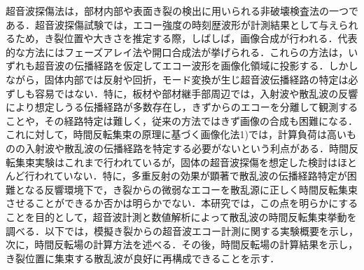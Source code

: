 超音波探傷法は，部材内部や表面き裂の検出に用いられる非破壊検査法の一つである．超音波探傷試験では，エコー強度の時刻歴波形が計測結果として与えられるため，き裂位置や大きさを推定する際，しばしば，画像合成が行われる．代表的な方法にはフェーズアレイ法や開口合成法が挙げられる．これらの方法は，いずれも超音波の伝播経路を仮定してエコー波形を画像化領域に投影する．しかしながら，固体内部では反射や回折，モード変換が生じ超音波伝播経路の特定は必ずしも容易ではない．特に，板材や部材継手部周辺では，入射波や散乱波の反響により想定しうる伝播経路が多数存在し，きずからのエコーを分離して観測することや，その経路特定は難しく，従来の方法ではきず画像の合成も困難になる．これに対して，時間反転集束の原理に基づく画像化法1)では，計算負荷は高いものの入射波や散乱波の伝播経路を特定する必要がないという利点がある．時間反転集束実験はこれまで行われているが，固体の超音波探傷を想定した検討はほとんど行われていない．特に，多重反射の効果が顕著で散乱波の伝播経路特定が困難となる反響環境下で，き裂からの微弱なエコーを散乱源に正しく時間反転集束させることができるか否かは明らかでない．本研究では，この点を明らかにすることを目的として，超音波計測と数値解析によって散乱波の時間反転集束挙動を調べる．以下では，模擬き裂からの超音波エコー計測に関する実験概要を示し，次に，時間反転場の計算方法を述べる．その後，時間反転場の計算結果を示し，き裂位置に集束する散乱波が良好に再構成できることを示す． 
